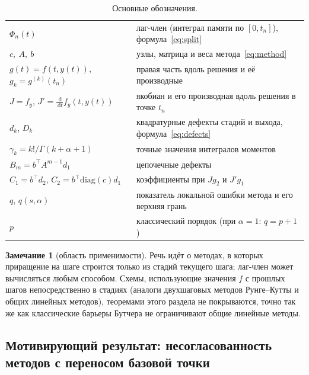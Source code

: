 \documentclass[11pt,a4paper]{article}
\theoremstyle{plain}
\theoremstyle{definition}
\newtheorem{remark}{Замечание}
\newcommand{\G}{\Gamma}
\newcommand{\dd}{\,\mathrm{d}}
\begin{document}
\begin{table}[ht]
\centering\small
\caption{Основные обозначения.}\label{tab:notation}
\begin{tabular}{ll}
\toprule
$\Phi_n(t)$ & лаг-член (интеграл памяти по $[0,t_n]$), формула~\eqref{eq:split}\\
$c,\ A,\ b$ & узлы, матрица и веса метода~\eqref{eq:method}\\
$g(t)=f(t,y(t))$, $g_k=g^{(k)}(t_n)$ & правая часть вдоль решения и её производные\\
$J=f_y$, $J'=\frac{\dd}{\dd t}f_y(t,y(t))$ & якобиан и его производная вдоль решения в точке $t_n$\\
$d_k$, $D_k$ & квадратурные дефекты стадий и выхода, формула~\eqref{eq:defects}\\
$\gamma_k=k!/\G(k+\alpha+1)$ & точные значения интегралов моментов\\
$B_m=b^{\top}A^{m-1}d_1$ & цепочечные дефекты\\
$C_1=b^{\top}d_2$, $C_2=b^{\top}\mathrm{diag}(c)d_1$ & коэффициенты при $Jg_2$ и $J'g_1$\\
$q$, $q(s,\alpha)$ & показатель локальной ошибки метода и его верхняя грань\\
$p$ & классический порядок (при $\alpha=1$: $q=p+1$)\\
\bottomrule
\end{tabular}
\end{table}

\begin{remark}[область применимости]\label{rem:scope}
Речь идёт о методах, в которых приращение на шаге строится только из стадий текущего шага; лаг-член может вычисляться любым способом. Схемы, использующие значения $f$ с прошлых шагов непосредственно в стадиях (аналоги двухшаговых методов Рунге--Кутты и общих линейных методов), теоремами этого раздела не покрываются, точно так же как классические барьеры Бутчера не ограничивают общие линейные методы.
\end{remark}

\subsection{Мотивирующий результат: несогласованность методов с переносом базовой точки}\label{sec:efork}
\end{document}
